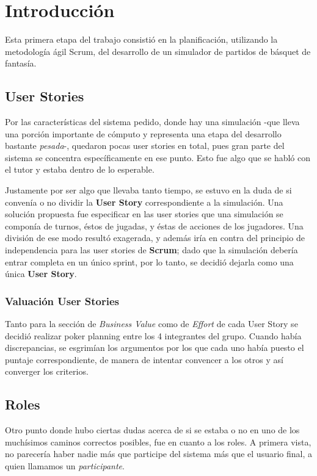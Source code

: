 \section{Introducción}
\indent \indent Esta primera etapa del trabajo consistió en la planificación, utilizando la metodología ágil Scrum, del desarrollo de un simulador de partidos de básquet de fantasía.

\subsection*{User Stories}
Por las características del sistema pedido, donde hay una simulación -que lleva una porción importante de cómputo y representa una etapa del desarrollo bastante \emph{pesada}-, quedaron pocas user stories en total, pues gran parte del sistema se concentra específicamente en ese punto. Esto fue algo que se habló con el tutor y estaba dentro de lo esperable.

Justamente por ser algo que llevaba tanto tiempo, se estuvo en la duda de si convenía o no dividir la \textbf{User Story} correspondiente a la simulación. Una solución propuesta fue especificar en las user stories que una simulación se componía de turnos, éstos de jugadas, y éstas de acciones de los jugadores. Una división de ese modo resultó exagerada, y además iría en contra del principio de independencia para las user stories de \textbf{Scrum}; dado que la simulación debería entrar completa en un único sprint, por lo tanto, se decidió dejarla como una única \textbf{User Story}.


\subsubsection*{Valuación User Stories}
Tanto para la sección de \emph{Business Value} como de \emph{Effort} de cada User Story se decidió realizar poker planning entre los 4 integrantes del grupo. Cuando había discrepancias, se esgrimían los argumentos por los que cada uno había puesto el puntaje correspondiente, de manera de intentar convencer a los otros y así converger los criterios.

\subsection*{Roles}
Otro punto donde hubo ciertas dudas acerca de si se estaba o no en uno de los muchísimos caminos correctos posibles, fue en cuanto a los roles. A primera vista, no parecería haber nadie más que participe del sistema más que el usuario final, a quien llamamos un \emph{participante}. 

